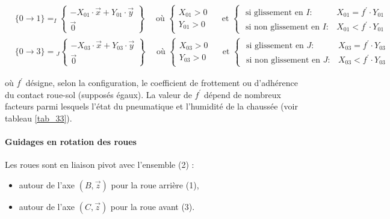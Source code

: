 $
\begin{aligned}
& \{0 \rightarrow 1\}=_{I}\left\{\begin{array}{c}
-X_{01} \cdot \vec{x}+Y_{01} \cdot \vec{y} \\
\overrightarrow{0}
\end{array}\right\} \quad \text { où }\left\{\begin{array} { c } 
{ X _ { 0 1 } > 0 } \\
{ Y _ { 0 1 } > 0 }
\end{array} \quad \text { et } \left\{\begin{array}{rl}
\text { si glissement en } I: & X_{01}=f^{\prime} \cdot Y_{01} \\
\text { si non glissement en } I: & X_{01}<f^{\prime} \cdot Y_{01}
\end{array}\right.\right. \\
& \{0 \rightarrow 3\}={ }_{J}\left\{\begin{array}{c}
-X_{03} \cdot \vec{x}+Y_{03} \cdot \vec{y} \\
\overrightarrow{0}
\end{array}\right\} \quad \text { où }\left\{\begin{array} { c } 
{ X _ { 0 3 } > 0 } \\
{ Y _ { 0 3 } > 0 }
\end{array} \quad \text { et } \left\{\begin{array}{rl}
\text { si glissement en } J: & X_{03}=f^{\prime} \cdot Y_{03} \\
\text { si non glissement en } J: & X_{03}<f^{\prime} \cdot Y_{03}
\end{array}\right.\right.
\end{aligned}
$

où \(f^{\prime}\) désigne, selon la configuration, le coefficient de frottement ou d'adhérence du contact roue-sol (supposés égaux). La valeur de \(f^{\prime}\) dépend de nombreux facteurs parmi lesquels l'état du pneumatique et l'humidité de la chaussée (voir tableau \ref{tab_33}).

\paragraph*{Guidages en rotation des roues} Les roues sont en liaison pivot avec l'ensemble (2) :

\begin{itemize}
  \item autour de l'axe \((B, \vec{z})\) pour la roue arrière (1),
  \item autour de l'axe \((C, \vec{z})\) pour la roue avant (3).
\end{itemize}

